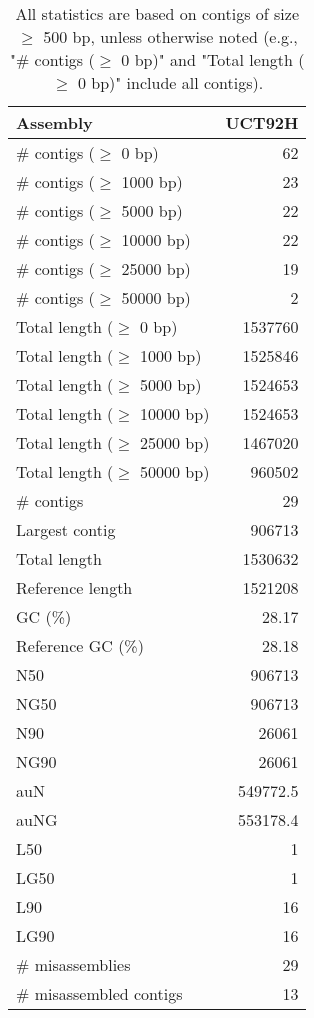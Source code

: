 \documentclass[12pt,a4paper]{article}
\begin{document}
\begin{table}[ht]
\begin{center}
\caption{All statistics are based on contigs of size $\geq$ 500 bp, unless otherwise noted (e.g., "\# contigs ($\geq$ 0 bp)" and "Total length ($\geq$ 0 bp)" include all contigs).}
\begin{tabular}{|l*{1}{|r}|}
\hline
Assembly & UCT92H \\ \hline
\# contigs ($\geq$ 0 bp) & 62 \\ \hline
\# contigs ($\geq$ 1000 bp) & 23 \\ \hline
\# contigs ($\geq$ 5000 bp) & 22 \\ \hline
\# contigs ($\geq$ 10000 bp) & 22 \\ \hline
\# contigs ($\geq$ 25000 bp) & 19 \\ \hline
\# contigs ($\geq$ 50000 bp) & 2 \\ \hline
Total length ($\geq$ 0 bp) & 1537760 \\ \hline
Total length ($\geq$ 1000 bp) & 1525846 \\ \hline
Total length ($\geq$ 5000 bp) & 1524653 \\ \hline
Total length ($\geq$ 10000 bp) & 1524653 \\ \hline
Total length ($\geq$ 25000 bp) & 1467020 \\ \hline
Total length ($\geq$ 50000 bp) & 960502 \\ \hline
\# contigs & 29 \\ \hline
Largest contig & 906713 \\ \hline
Total length & 1530632 \\ \hline
Reference length & 1521208 \\ \hline
GC (\%) & 28.17 \\ \hline
Reference GC (\%) & 28.18 \\ \hline
N50 & 906713 \\ \hline
NG50 & 906713 \\ \hline
N90 & 26061 \\ \hline
NG90 & 26061 \\ \hline
auN & 549772.5 \\ \hline
auNG & 553178.4 \\ \hline
L50 & 1 \\ \hline
LG50 & 1 \\ \hline
L90 & 16 \\ \hline
LG90 & 16 \\ \hline
\# misassemblies & 29 \\ \hline
\# misassembled contigs & 13 \\ \hline

\end{tabular}
\end{center}
\end{table}
\end{document}
